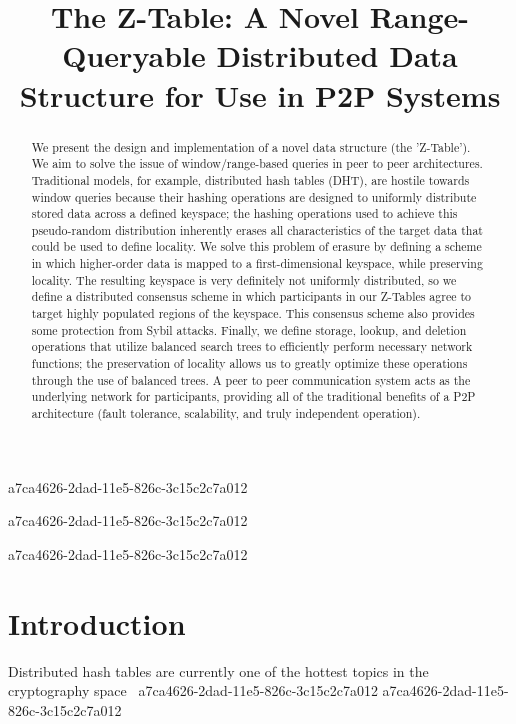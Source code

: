 \documentclass[12pt]{article}
\title{The Z-Table: A Novel Range-Queryable Distributed Data Structure for Use in P2P Systems}
\begin{document}
a7ca4626-2dad-11e5-826c-3c15c2c7a012\maketitle
a7ca4626-2dad-11e5-826c-3c15c2c7a012
\begin{abstract}
We present the design and implementation of a novel data structure (the 'Z-Table'). We aim to solve the issue of window/range-based queries in peer to peer architectures. Traditional models, for example,  distributed hash tables (DHT), are hostile towards window queries because their hashing operations are designed to uniformly distribute stored data across a defined keyspace; the hashing operations used to achieve this pseudo-random distribution inherently erases all characteristics of the target data that could be used to define locality. We solve this problem of erasure by defining a scheme in which higher-order data is mapped to a first-dimensional keyspace, while preserving locality. The resulting keyspace is very definitely not uniformly distributed, so we define a distributed consensus scheme in which participants in our Z-Tables agree to target highly populated regions of the keyspace. This consensus scheme also provides some protection from Sybil attacks. Finally, we define storage, lookup, and deletion operations that utilize balanced search trees to efficiently perform necessary network functions; the preservation of locality allows us to greatly optimize these operations through the use of balanced trees. A peer to peer communication system acts as the underlying network for participants, providing all of the traditional benefits of a P2P architecture (fault tolerance, scalability, and truly independent operation).
\end{abstract}

a7ca4626-2dad-11e5-826c-3c15c2c7a012
\newpage
\section{Introduction}
Distributed hash tables are currently one of the hottest topics in the cryptography space~\cite{Stoica:2001dj,Rowstron:2001ea,Ratnasamy:2001wn}
a7ca4626-2dad-11e5-826c-3c15c2c7a012
a7ca4626-2dad-11e5-826c-3c15c2c7a012\printbibliography
\end{document}
